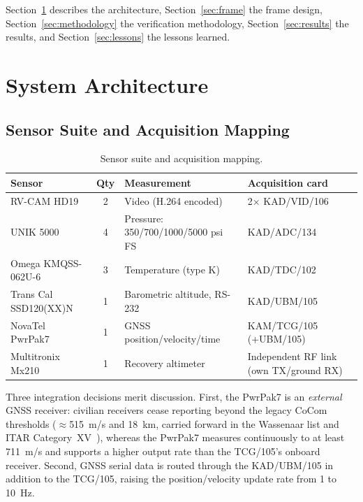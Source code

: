 \documentclass[12pt,letterpaper]{article}
\begin{document}
Section~\ref{sec:architecture} describes the architecture,
Section~\ref{sec:frame} the frame design, Section~\ref{sec:methodology}
the verification methodology, Section~\ref{sec:results} the results, and
Section~\ref{sec:lessons} the lessons learned.

\section{System Architecture}\label{sec:architecture}

\subsection{Sensor Suite and Acquisition Mapping}

\begin{table}[htbp]
  \centering
  \caption{Sensor suite and acquisition mapping.}
  \label{tab:sensors}
  \footnotesize
  \begin{tabular}{@{}p{3.4cm}cp{4.8cm}p{4.6cm}@{}}
    \toprule
    Sensor & Qty & Measurement & Acquisition card \\
    \midrule
    RV-CAM HD19 & 2 & Video (H.264 encoded) & 2$\times$ KAD/VID/106 \\
    UNIK 5000 & 4 & Pressure: 350/700/1000/5000 psi FS & KAD/ADC/134 \\
    Omega KMQSS-062U-6 & 3 & Temperature (type K) & KAD/TDC/102 \\
    Trans Cal SSD120(XX)N & 1 & Barometric altitude, RS-232 & KAD/UBM/105 \\
    NovaTel PwrPak7 & 1 & GNSS position/velocity/time & KAM/TCG/105 (+UBM/105) \\
    Multitronix Mx210 & 1 & Recovery altimeter & Independent RF link (own TX/ground RX) \\
    \bottomrule
  \end{tabular}
\end{table}

Three integration decisions merit discussion. First, the PwrPak7 is an
\emph{external} GNSS receiver: civilian receivers cease reporting beyond
the legacy CoCom thresholds (${\approx}$515~m/s and 18~km, carried
forward in the Wassenaar list and ITAR
Category~XV~\cite{wassenaar,itar}), whereas the PwrPak7 measures
continuously to at least 711~m/s and supports a higher output rate than
the TCG/105's onboard receiver. Second, GNSS serial data is routed
through the KAD/UBM/105 in addition to the TCG/105, raising the
position/velocity update rate from 1 to 10~Hz.
\end{document}

